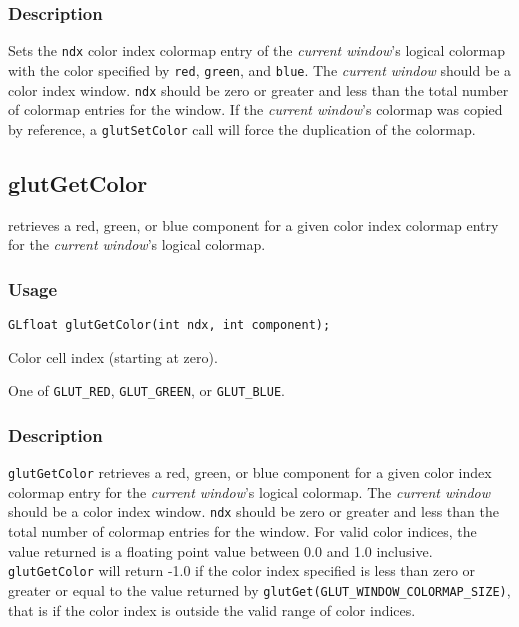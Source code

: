 \subsubsection*{Description}

Sets the {\tt ndx} color index colormap entry of the {\em current window}'s logical
colormap with the color specified by {\tt red}, {\tt green}, and {\tt blue}.
The {\em current window} should be a color index window.
{\tt ndx} should be zero or greater and less than the total number of colormap entries
for the window.
If the {\em current window}'s colormap was copied by reference,
a {\tt glutSetColor} call will force the duplication of the colormap.

\subsection{glutGetColor}

 retrieves a red, green, or blue component for a given
color index colormap entry for the {\em current window}'s logical colormap.

\subsubsection*{Usage}
\begin{verbatim}
GLfloat glutGetColor(int ndx, int component);
\end{verbatim}
\begin{description}
\itemsep 0in
\item[\tt ndx]
Color cell index (starting at zero).
\item[\tt component]
One of {\tt GLUT\_RED}, {\tt GLUT\_GREEN}, or {\tt GLUT\_BLUE}.
\end{description}

\subsubsection*{Description}

{\tt glutGetColor} retrieves a red, green, or blue component for a given
color index colormap entry for the {\em current window}'s logical colormap.
The {\em current window} should be a color index window.
{\tt ndx} should be zero or greater and less than the total number of colormap entries
for the window.
For valid color indices, the value returned is a floating point value between 0.0
and 1.0 inclusive.  {\tt glutGetColor} will return -1.0 if the color
index specified is less than zero or greater or equal to the value returned
by {\tt glutGet(GLUT\_WINDOW\_COLORMAP\_SIZE)}, that is if the color index
is outside the valid range of color indices.

